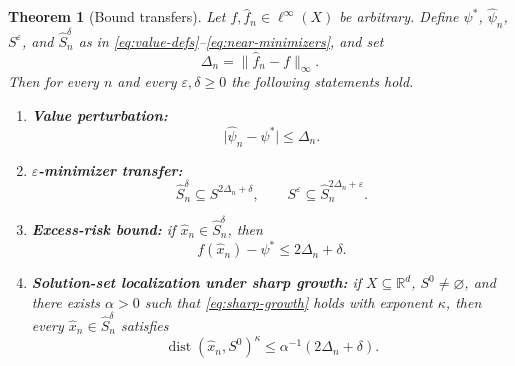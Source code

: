 \documentclass[10pt,a4paper]{amsart}
\newtheorem{theorem}{Theorem}
\begin{document}
\begin{theorem}[Bound transfers]\label{thm:deterministic} Let $f,\hat{f}_{n}\in\ell^{\infty}(X)$
be arbitrary. Define $\psi^{*}$, $\hat{\psi}_{n}$, $S^{\varepsilon}$,
and $\hat{S}_{n}^{\delta}$ as in \eqref{eq:value-defs}--\eqref{eq:near-minimizers},
and set
\[
\Delta_{n}=\lVert\hat{f}_{n}-f\rVert_{\infty}.
\]
Then for every $n$ and every $\varepsilon,\delta\ge0$ the following
statements hold. 
\begin{enumerate}[label=(\alph*),itemsep=0.25em]
\item \textbf{Value perturbation:} 
\begin{equation}
\lvert\hat{\psi}_{n}-\psi^{*}\rvert\le\Delta_{n}.\label{eq:value-perturbation}
\end{equation}
\item \textbf{$\varepsilon$-minimizer transfer:} 
\begin{equation}
\hat{S}_{n}^{\delta}\subseteq S^{2\Delta_{n}+\delta},\qquad S^{\varepsilon}\subseteq\hat{S}_{n}^{2\Delta_{n}+\varepsilon}.\label{eq:near-transfer}
\end{equation}
\item \textbf{Excess-risk bound:} if $\hat{x}_{n}\in\hat{S}_{n}^{\delta}$,
then 
\begin{equation}
f(\hat{x}_{n})-\psi^{*}\le2\Delta_{n}+\delta.\label{eq:excess-risk-bound}
\end{equation}
\item \textbf{Solution-set localization under sharp growth:} if $X\subseteq\mathbb{R}^{d}$,
$S^{0}\neq\varnothing$, and there exists $\alpha>0$ such that
\eqref{eq:sharp-growth} holds with exponent $\kappa$, then every
$\hat{x}_{n}\in\hat{S}_{n}^{\delta}$ satisfies
\begin{equation}
\operatorname{dist}(\hat{x}_{n},S^{0})^{\kappa}\le\alpha^{-1}(2\Delta_{n}+\delta).\label{eq:distance-bound}
\end{equation}
\end{enumerate}
\end{theorem}
\end{document}
